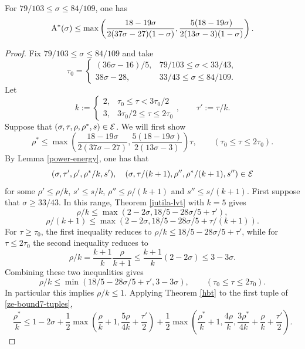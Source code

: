 \begin{theorem}\label{imp-energy-bound7}
For $79/103 \le \sigma \le 84/109$, one has
\[
\mathrm{A}^*(\sigma) \le \max\left(\frac{18 - 19\sigma}{2(37\sigma - 27)(1 - \sigma)}, \frac{5(18 - 19\sigma)}{2(13\sigma - 3)(1 - \sigma)}\right).
\]
\end{theorem}
\derived
{}

\begin{proof}
Fix $79/103 \le \sigma \le 84/109$ and take
\[
\tau_0 = \begin{cases}
(36\sigma - 16)/5,& 79/103 \le \sigma < 33/43,\\
38\sigma - 28,& 33/43 \le \sigma \le 84/109.
\end{cases}
\]
Let
\[
k := \begin{cases}
2,& \tau_0 \le \tau < 3\tau_0/2\\
3,& 3\tau_0/2 \le \tau \le 2\tau_0
\end{cases},\qquad \tau' := \tau/k.
\]
Suppose that $(\sigma, \tau, \rho, \rho^*, s) \in \mathcal{E}$. We will first show
\begin{equation}\label{ze-bound7-rhostar-bound}
\rho^* \le \max\left(\frac{18 - 19\sigma}{2(37\sigma - 27)}, \frac{5(18 - 19\sigma)}{2(13\sigma - 3)}\right)\tau,\qquad (\tau_0 \le \tau \le 2\tau_0).
\end{equation}
By Lemma \ref{power-energy}, one has that
\begin{equation}\label{ze-bound7-tuples}
(\sigma, \tau', \rho', \rho^*/k, s'),\quad (\sigma, \tau/(k + 1), \rho'', \rho^*/(k + 1), s'') \in \mathcal{E}
\end{equation}
for some $\rho' \le \rho/k$, $s' \le s/k$, $\rho'' \le \rho/(k + 1)$ and $s'' \le s/(k + 1)$.
First suppose that $\sigma \ge 33/43$. In this range, Theorem \ref{jutila-lvt} with $k = 5$ gives
\[
\rho/k \le \max(2 - 2\sigma, 18/5 - 28\sigma/5 + \tau'),
\]
\[
\rho/(k + 1) \le \max(2 - 2\sigma, 18/5 - 28\sigma/5 + \tau/(k + 1)).
\]
For $\tau \ge \tau_0$, the first inequality reduces to $\rho/k \le 18/5 - 28\sigma/5 + \tau'$, while for $\tau \le 2\tau_0$ the second inequality reduces to
\[
\rho/k = \frac{k + 1}{k}\frac{\rho}{k + 1} \le \frac{k + 1}{k}(2 - 2\sigma) \le 3 - 3\sigma.
\]
Combining these two inequalities gives
\[
\rho/k \le \min\left(18/5 - 28\sigma/5 + \tau', 3 - 3\sigma\right),\qquad (\tau_0 \le \tau \le 2\tau_0).
\]
In particular this implies $\rho/k \le 1$. Applying Theorem \ref{hbt} to the first tuple of \eqref{ze-bound7-tuples},
\[
\frac{\rho^*}{k} \le 1-2\sigma + \frac{1}{2}\max(\frac{\rho}{k}+1, \frac{5\rho}{4k} + \frac{\tau'}{2}) + \frac{1}{2}\max(\frac{\rho^*}{k}+1, \frac{4\rho}{k}, \frac{3\rho^*}{4k} +\frac{\rho}{k}+\frac{\tau'}{2}).
\]
\end{proof}

